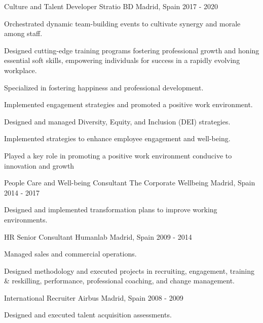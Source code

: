 \begin{cventries}
   \cventry
    {Culture and Talent Developer} %
    {Stratio BD} %
    {Madrid, Spain} %
    {2017 - 2020} %
    {
      \begin{cvitems} %
        \item {Orchestrated dynamic team-building events to cultivate synergy and morale among staff.}
        \item {Designed cutting-edge training programs fostering professional growth and honing essential soft skills, empowering individuals for success in a rapidly evolving workplace.}
        \item {Specialized in fostering happiness and professional development.}
        \item {Implemented engagement strategies and promoted a positive work environment.}
        \item {Designed and managed Diversity, Equity, and Inclusion (DEI) strategies.}
        \item {Implemented strategies to enhance employee engagement and well-being.}
        \item {Played a key role in promoting a positive work environment conducive to innovation and growth}
      \end{cvitems}
    }

   \cventry
    {People Care and Well-being Consultant} %
    {The Corporate Wellbeing} %
    {Madrid, Spain} %
    {2014 - 2017} %
    {
      \begin{cvitems} %
        \item {Designed and implemented transformation plans to improve working environments.}
      \end{cvitems}
    }


   \cventry
    {HR Senior Consultant} %
    {Humanlab} %
    {Madrid, Spain} %
    {2009 - 2014} %
    {
      \begin{cvitems} %
        \item {Managed sales and commercial operations.}
        \item {Designed methodology and executed projects in recruiting, engagement, training \& reskilling, performance, professional coaching, and change management.}
      \end{cvitems}
    }

   \cventry
    {International Recruiter} %
    {Airbus} %
    {Madrid, Spain} %
    {2008 - 2009} %
    {
      \begin{cvitems} %
        \item {Designed and executed talent acquisition assessments.}
      \end{cvitems}
    }


\end{cventries}
